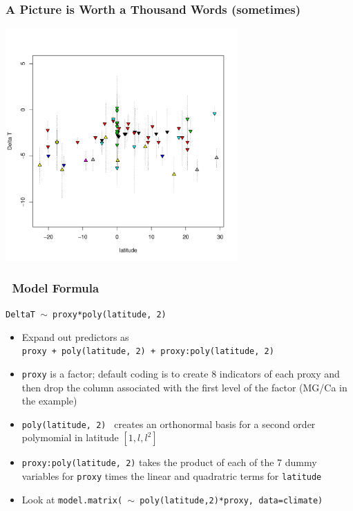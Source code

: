 \documentclass[handout]{beamer}
\begin{document}
\begin{frame}
  \frametitle{A Picture is Worth a Thousand Words (sometimes)}
\centerline{\includegraphics[height=3.5in]{temp-lat}}
\end{frame}
\begin{frame}
  \frametitle{ \R\ Model Formula}
\centerline{{\tt DeltaT $\sim$ proxy*poly(latitude, 2) }}
\pause
\begin{itemize}
\item Expand out predictors as\\
\small{{\tt proxy + poly(latitude, 2) + proxy:poly(latitude,
  2)}} \pause
\item {\tt proxy}  is a factor; default coding is to create 8  indicators
  of each proxy and then drop the column  associated with the first
  level of the factor  (MG/Ca in the example) \pause
\item {\tt poly(latitude, 2) } creates an orthonormal basis for a
  second order polymomial in latitude $[1, l, l^2]$ \pause
\item {\tt proxy:poly(latitude,  2)} takes the product of each of the 7 dummy
  variables for {\tt proxy} times the linear and quadratric terms for {\tt latitude}
\item Look at {\tt model.matrix( $\sim$ poly(latitude,2)*proxy, data=climate)}
\end{itemize}
\end{frame}
\end{document}
